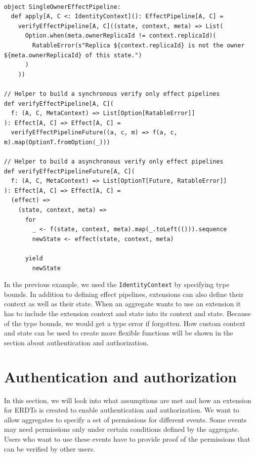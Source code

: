 \documentclass[
	english,
	ruledheaders=section,   %
	class=report,		    %
	thesis={type=bachelor}, %
	accentcolor=9c,			%
	custommargins=true,    %
	marginpar=false,        %
	parskip=half-,          %
	fontsize=11pt,          %
]{tudapub}
\begin{document}
\begin{lstlisting}
  
object SingleOwnerEffectPipeline:
  def apply[A, C <: IdentityContext](): EffectPipeline[A, C] =
    verifyEffectPipeline[A, C]((state, context, meta) => List(
      Option.when(meta.ownerReplicaId != context.replicaId)(
        RatableError(s"Replica ${context.replicaId} is not the owner ${meta.ownerReplicaId} of this state.")
      )
    ))

// Helper to build a synchronous verify only effect pipelines
def verifyEffectPipeline[A, C](
  f: (A, C, MetaContext) => List[Option[RatableError]]
): Effect[A, C] => Effect[A, C] =
  verifyEffectPipelineFuture((a, c, m) => f(a, c, m).map(OptionT.fromOption(_)))
  
// Helper to build a asynchronous verify only effect pipelines
def verifyEffectPipelineFuture[A, C](
  f: (A, C, MetaContext) => List[OptionT[Future, RatableError]]
): Effect[A, C] => Effect[A, C] =
  (effect) =>
    (state, context, meta) => 
      for
        _ <- f(state, context, meta).map(_.toLeft(())).sequence
        newState <- effect(state, context, meta)

      yield
        newState

\end{lstlisting}

In the previous example, we used the \texttt{IdentityContext} by specifying type bounds. In addition to defining effect pipelines, extensions can also define their context as well as their state. When an aggregate wants to use an extension it has to include the extension context and state into its context and state. Because of the type bounds, we would get a type error if forgotten. How custom context and state can be used to create more flexible functions will be shown in the section about authentication and authorization.

\section{Authentication and authorization}
In this section, we will look into what assumptions are met and how an extension for ERDTs is created to enable authentication and authorization. We want to allow aggregates to specify a set of permissions for different events. Some events may need permissions only under certain conditions defined by the aggregate. Users who want to use these events have to provide proof of the permissions that can be verified by other users.
\end{document}
